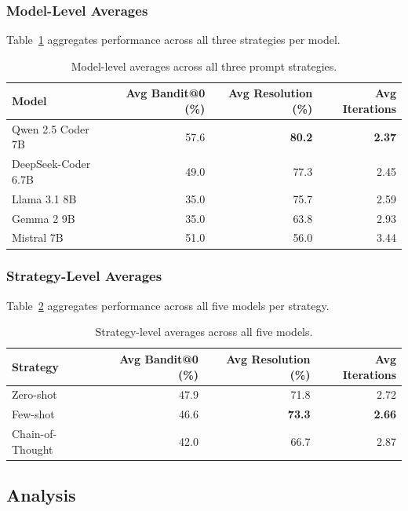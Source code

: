 \documentclass[runningheads]{llncs}
\begin{document}
\subsubsection{Model-Level Averages}

Table~\ref{tab:model_avg} aggregates performance across all three strategies per model.

\begin{table}[H]
\centering
\caption{Model-level averages across all three prompt strategies.}
\label{tab:model_avg}
\begin{tabular}{lrrr}
\toprule
\textbf{Model} & \textbf{Avg Bandit@0 (\%)} & \textbf{Avg Resolution (\%)} & \textbf{Avg Iterations} \\
\midrule
Qwen 2.5 Coder 7B   & 57.6 & \textbf{80.2} & \textbf{2.37} \\
DeepSeek-Coder 6.7B & 49.0 & 77.3 & 2.45 \\
Llama 3.1 8B        & 35.0 & 75.7 & 2.59 \\
Gemma 2 9B          & 35.0 & 63.8 & 2.93 \\
Mistral 7B          & 51.0 & 56.0 & 3.44 \\
\bottomrule
\end{tabular}
\end{table}

\subsubsection{Strategy-Level Averages}

Table~\ref{tab:strategy_avg} aggregates performance across all five models per strategy.

\begin{table}[H]
\centering
\caption{Strategy-level averages across all five models.}
\label{tab:strategy_avg}
\begin{tabular}{lrrr}
\toprule
\textbf{Strategy} & \textbf{Avg Bandit@0 (\%)} & \textbf{Avg Resolution (\%)} & \textbf{Avg Iterations} \\
\midrule
Zero-shot        & 47.9 & 71.8 & 2.72 \\
Few-shot         & 46.6 & \textbf{73.3} & \textbf{2.66} \\
Chain-of-Thought & 42.0 & 66.7 & 2.87 \\
\bottomrule
\end{tabular}
\end{table}

\subsection{Analysis}
\end{document}
